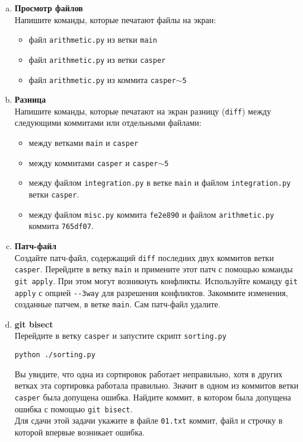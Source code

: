 \documentclass{article}
\begin{document}
\begin{enumerate}[a.]
\item \textbf{Просмотр файлов}\\
Напишите команды, которые печатают файлы на экран:
\begin{itemize}
\item файл \texttt{arithmetic.py} из ветки \texttt{main}
\item файл \texttt{arithmetic.py} из ветки \texttt{casper}
\item файл \texttt{arithmetic.py} из коммита \texttt{casper$\sim$5}
\end{itemize}

\item \textbf{Разница}\\
Напишите команды, которые печатают на экран разницу (\texttt{diff}) между следующими коммитами или отдельными файлами:
\begin{itemize}
\item между ветками \texttt{main} и \texttt{casper}
\item между коммитами \texttt{casper} и \texttt{casper$\sim$5}
\item между файлом \texttt{integration.py} в ветке \texttt{main} и файлом \texttt{integration.py} ветки \texttt{casper}.
\item между файлом \texttt{misc.py} коммита \texttt{fe2e890} и файлом \texttt{arithmetic.py} коммита \texttt{765df07}.
\end{itemize}

\item \textbf{Патч-файл}\\
Создайте патч-файл, содержащий \texttt{diff} последних двух коммитов ветки \texttt{casper}.
Перейдите в ветку \texttt{main} и примените этот патч с помощью команды \texttt{git apply}. При этом могут возникнуть конфликты. Используйте команду \texttt{git apply} с опцией  \texttt{-{}-3way} для разрешения конфликтов. Закоммите изменения, созданные патчем, в ветке \texttt{main}. Сам патч-файл удалите.

\item \textbf{git bisect}\\
Перейдите в ветку \texttt{casper} и запустите скрипт \texttt{sorting.py}
\begin{lstlisting}
python ./sorting.py
\end{lstlisting}
Вы увидите, что одна из сортировок работает неправильно, хотя в других ветках эта сортировка работала правильно. Значит в одном из коммитов ветки \texttt{casper} была допущена ошибка. Найдите коммит, в котором была допущена ошибка с помощью \texttt{git bisect}.\\
Для сдачи этой задачи укажите в файле \texttt{01.txt} коммит, файл и строчку в которой впервые возникает ошибка.


\end{enumerate}
\end{document}
